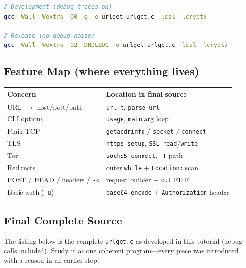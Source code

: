 \begin{lstlisting}[style=snippet,language=bash]
# Development (debug traces on)
gcc -Wall -Wextra -O0 -g -o urlget urlget.c -lssl -lcrypto

# Release (no debug noise)
gcc -Wall -Wextra -O2 -DNDEBUG -o urlget urlget.c -lssl -lcrypto
\end{lstlisting}

\subsection{Feature Map (where everything lives)}

\begin{center}
\begin{tabular}{@{}ll@{}}
\hline
\textbf{Concern} & \textbf{Location in final source} \\
\hline
URL $\rightarrow$ host/port/path & \texttt{url\_t}, \texttt{parse\_url} \\
CLI options & \texttt{usage}, \texttt{main} arg loop \\
Plain TCP & \texttt{getaddrinfo} / \texttt{socket} / \texttt{connect} \\
TLS & \texttt{https\_setup}, \texttt{SSL\_read}/\texttt{write} \\
Tor & \texttt{socks5\_connect}, \texttt{-T} path \\
Redirects & outer \texttt{while} + \texttt{Location:} scan \\
POST / HEAD / headers / \texttt{-o} & request builder + \texttt{out} FILE \\
Basic auth (\texttt{-u}) & \texttt{base64\_encode} + \texttt{Authorization} header \\
\hline
\end{tabular}
\end{center}

\subsection{Final Complete Source}

The listing below is the complete \texttt{urlget.c} as developed in this
tutorial (debug calls included). Study it as one coherent program---every
piece was introduced with a reason in an earlier step.

